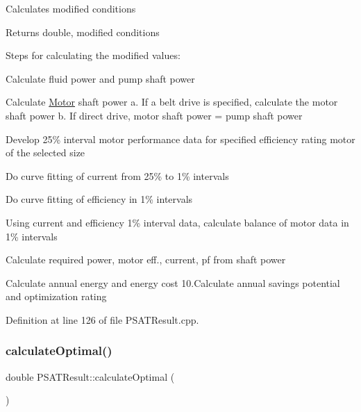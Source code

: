 Calculates modified conditions \begin{DoxyReturn}{Returns}
double, modified conditions 
\end{DoxyReturn}
Steps for calculating the modified values\+:
\begin{DoxyEnumerate}
\item Calculate fluid power and pump shaft power
\item Calculate \hyperlink{class_motor}{Motor} shaft power a. If a belt drive is specified, calculate the motor shaft power b. If direct drive, motor shaft power = pump shaft power
\item Develop 25\% interval motor performance data for specified efficiency rating motor of the selected size
\item Do curve fitting of current from 25\% to 1\% intervals
\item Do curve fitting of efficiency in 1\% intervals
\item Using current and efficiency 1\% interval data, calculate balance of motor data in 1\% intervals
\item Calculate required power, motor eff., current, pf from shaft power
\item Calculate annual energy and energy cost 10.\+Calculate annual savings potential and optimization rating
\end{DoxyEnumerate}

Definition at line 126 of file P\+S\+A\+T\+Result.\+cpp.

\mbox{\label{class_p_s_a_t_result_a25d50cd89b326f18449496a56d54f472}} 
\subsubsection{\texorpdfstring{calculate\+Optimal()}{calculateOptimal()}}
{\footnotesize\ttfamily double P\+S\+A\+T\+Result\+::calculate\+Optimal (\begin{DoxyParamCaption}{ }\end{DoxyParamCaption})}

